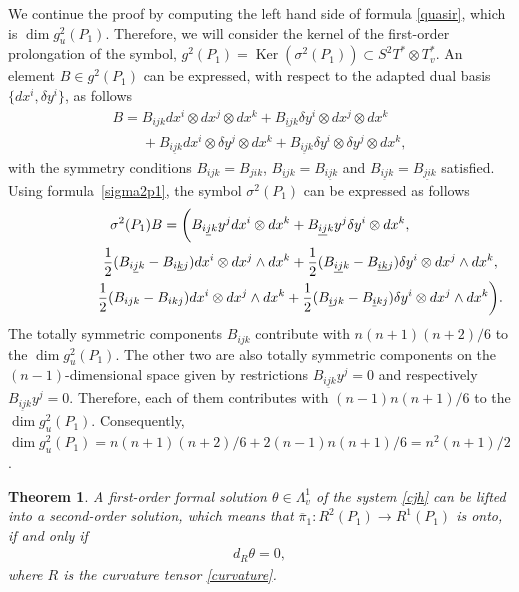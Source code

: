 \documentclass[11pt]{article}
\numberwithin{equation}{section}
\newtheorem{Theorem}{Theorem}[section]
\begin{document}
We continue the proof by computing the left hand side of formula
\eqref{quasir}, which is $\dim g^2_u(P_1)$.
Therefore, we will consider the kernel of the f\/irst-order prolongation of the symbol,
$g^2(P_1)=\operatorname{Ker}\left(\sigma^2(P_1)\right)\subset
S^2T^*\otimes T^*_v$. An element $B\in g^2(P_1)$ can be expressed,
with respect to the adapted dual basis $\{dx^i, \delta y^i\}$, as
follows
\begin{gather*}
B=B_{ijk}dx^i\otimes dx^j\otimes dx^k + B_{\underline{i}jk}\delta
y^i \otimes dx^j \otimes dx^k \\
\phantom{B=}{} + B_{i\underline{j}k}dx^i \otimes
\delta y^j \otimes dx^k + B_{\underline{ij}k}\delta y^i \otimes
\delta y^j \otimes dx^k,
\end{gather*}
with the symmetry conditions $B_{ijk}=B_{jik}$,
$B_{\underline{i}jk}=B_{i\underline{j}k}$ and
$B_{\underline{ij}k}=B_{\underline{ji}k}$ satisf\/ied. Using formula~\eqref{sigma2p1}, the symbol $\sigma^2(P_1)$ can be expressed as
follows
\begin{gather*}
\sigma^2(P_1)B  = \bigg(B_{i\underline{j}k}y^j dx^i \otimes dx^k +
B_{\underline{ij}k}y^j \delta y^i \otimes dx^k,  \\
\hphantom{\sigma^2(P_1)B  = \bigg(}{}  \frac{1}{2}(B_{i\underline{j}k} -
B_{i\underline{k}j})dx^i\otimes dx^j \wedge dx^k +
\frac{1}{2}(B_{\underline{ij}k} - B_{\underline{ik}j})\delta
y^i\otimes dx^j \wedge dx^k, \\
\hphantom{\sigma^2(P_1)B  = \bigg(}{}  \frac{1}{2}(B_{ijk} - B_{ikj})dx^i\otimes dx^j \wedge
dx^k + \frac{1}{2}(B_{\underline{i}jk} -
B_{\underline{i}kj})\delta y^i\otimes dx^j \wedge dx^k\bigg).
\end{gather*}
The totally symmetric components $B_{ijk}$ contribute with
$n(n+1)(n+2)/6$ to the $\dim g^2_u(P_1)$. The other two are also
totally symmetric components on the $(n-1)$-dimensional space
given by restrictions $B_{i\underline{j}k}y^j=0$ and respectively
$B_{\underline{ij}k}y^j=0$. Therefore, each of them contributes
with $(n-1)n(n+1)/6$ to the $\dim g^2_u(P_1)$. Consequently, $\dim
g^2_u(P_1)=n(n+1)(n+2)/6+2(n-1)n(n+1)/6=n^2(n+1)/2$.
\setcounter{Theorem}{2}
\begin{Theorem} \label{thm:obstr1} A first-order formal solution $\theta \in \Lambda^1_v$ of
the system \eqref{cjh} can be lifted into a second-order solution,
which means that $\overline{\pi}_{1}: R^{2}(P_1) \to R^{1}(P_1)$
is onto, if and only if
\begin{gather} d_R\theta=0, \label{drtheta} \end{gather}
where $R$ is the curvature tensor \eqref{curvature}.
\end{Theorem}
\end{document}
